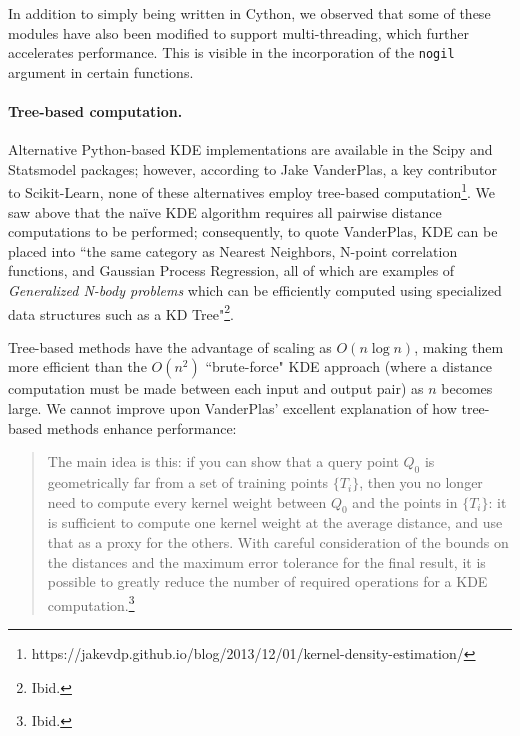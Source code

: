 \documentclass[11pt]{article}
\begin{document}
\noindent In addition to simply being written in Cython, we observed that some of these modules have also been modified to support multi-threading, which further accelerates performance. This is visible in the incorporation of the \texttt{nogil} argument in certain functions.

\newpage

\paragraph{Tree-based computation.} Alternative Python-based KDE implementations are available in the Scipy and Statsmodel packages; however, according to Jake VanderPlas, a key contributor to  Scikit-Learn, none of these alternatives employ tree-based computation\footnote{https://jakevdp.github.io/blog/2013/12/01/kernel-density-estimation/}. We saw above that the na\"ive KDE algorithm requires all pairwise distance computations to be performed; consequently, to quote VanderPlas, KDE can be placed into ``the same category as Nearest Neighbors, N-point correlation functions, and Gaussian Process Regression, all of which are examples of \textit{Generalized N-body problems} which can be efficiently computed using specialized data structures such as a KD Tree"\footnote{Ibid.}. \medskip

\noindent Tree-based methods have the advantage of scaling as $O(n \log n)$, making them more efficient than the $O(n^2)$ ``brute-force" KDE approach (where a distance computation must be made between each input and output pair) as $n$ becomes large. We cannot improve upon VanderPlas' excellent explanation of how tree-based methods enhance performance: \medskip

\begin{quote}
The main idea is this: if you can show that a query point $Q_0$ is geometrically far from a set of training points $\{T_i\}$, then you no longer need to compute every kernel weight between $Q_0$ and the points in $\{T_i\}$: it is sufficient to compute one kernel weight at the average distance, and use that as a proxy for the others. With careful consideration of the bounds on the distances and the maximum error tolerance for the final result, it is possible to greatly reduce the number of required operations for a KDE computation.\footnote{Ibid.}
\end{quote}
 
\end{document}
